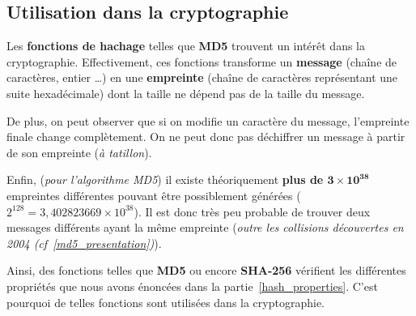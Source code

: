 \documentclass[12pt, a4paper]{article}
\begin{document}
\subsection{Utilisation dans la cryptographie}

Les \textbf{fonctions de hachage} telles que \textbf{MD5} trouvent un intérêt dans la cryptographie.
Effectivement, ces fonctions transforme un \textbf{message} (chaîne de caractères, entier \ldots) en une \textbf{empreinte}
(chaîne de caractères représentant une suite hexadécimale) dont la taille ne dépend pas de la taille du message.

\noindent De plus, on peut observer que si on modifie un caractère du message, l'empreinte finale change complètement.
On ne peut donc pas déchiffrer un message à partir de son empreinte (\textit{à tatillon}).

\noindent Enfin, (\textit{pour l'algorithme MD5}) il existe théoriquement \textbf{plus de $\mathbf{3\times 10^{38}}$}
empreintes différentes pouvant être possiblement générées
($2^{128} = 3,402823669 \times 10^{38}$).
Il est donc très peu probable de trouver deux messages différents ayant la même empreinte
(\textit{outre les collisions découvertes en 2004 (cf~\ref{md5_presentation})}).

\bigskip
Ainsi, des fonctions telles que \textbf{MD5} ou encore \textbf{SHA-256} vérifient les différentes propriétés
que nous avons énoncées dans la partie~\ref{hash_properties}. C'est pourquoi de telles fonctions sont utilisées
dans la cryptographie.
\end{document}
